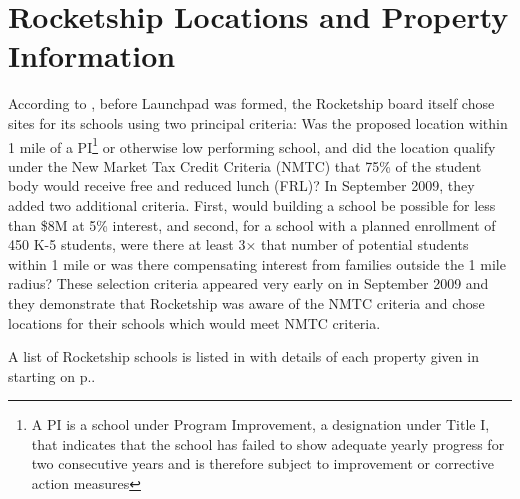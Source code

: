 \section{Rocketship Locations and Property Information}
\label{sec:location-and-property-info}\indent%

According to \textcite[7]{RSED2009c}, before Launchpad was formed, the Rocketship board itself chose sites for its schools using two principal criteria: Was the proposed location within 1 mile of a PI\footnote{A PI is a school under Program Improvement, a designation under Title I, that indicates that the school has failed to show adequate yearly progress for two consecutive years and is therefore subject to improvement or corrective action measures} or otherwise low performing school, and did the location qualify under the New Market Tax Credit Criteria (NMTC) that 75\% of the student body would receive free and reduced lunch (FRL)? In September 2009, they added two additional criteria. First, would building a school be possible for less than \$8M at 5\% interest, and second, for a school with a planned enrollment of 450 K-5 students, were there at least 3× that number of potential students within 1 mile or was there compensating interest from families outside the 1 mile radius? These selection criteria appeared very early on in September 2009  and they demonstrate that Rocketship was aware of the NMTC criteria and chose locations for their schools which would meet NMTC criteria.

A list of Rocketship schools is listed in  with details of each property given in   starting on p.\pageref{appx:rocketship-property-info}.

